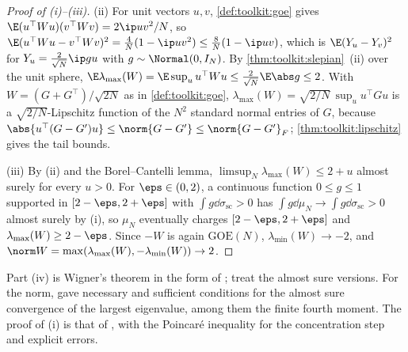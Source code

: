 \begin{refsection}
\begin{proof}[Proof of (i)--(iii)]
(ii) For unit vectors $u,v$, \cref{def:toolkit:goe} gives $\E(u^\top Wu)(v^\top Wv)=2\ip uv^2/N$, so $\E(u^\top Wu-v^\top Wv)^2=\frac4N(1-\ip uv^2)\le\frac8N(1-\ip uv)$, which is $\E(Y_u-Y_v)^2$ for $Y_u=\frac2{\sqrt N}\ip gu$ with $g\sim\Normal(0,I_N)$. By \cref{thm:toolkit:slepian}~(ii) over the unit sphere, $\E\lambda_{\max}(W)=\E\sup_uu^\top Wu\le\frac2{\sqrt N}\E\abs g\le2$. With $W=(G+G^\top)/\sqrt{2N}$ as in \cref{def:toolkit:goe}, $\lambda_{\max}(W)=\sqrt{2/N}\,\sup_uu^\top Gu$ is a $\sqrt{2/N}$-Lipschitz function of the $N^2$ standard normal entries of $G$, because $\abs{u^\top(G-G')u}\le\norm{G-G'}\le\norm{G-G'}_F$; \cref{thm:toolkit:lipschitz} gives the tail bounds.

(iii) By (ii) and the Borel--Cantelli lemma, $\limsup_N\lambda_{\max}(W)\le2+u$ almost surely for every $u>0$. For $\eps\in(0,2)$, a continuous function $0\le g\le1$ supported in $[2-\eps,2+\eps]$ with $\int g\dd\sigma_{\mathrm{sc}}>0$ has $\int g\dd\mu_N\to\int g\dd\sigma_{\mathrm{sc}}>0$ almost surely by (i), so $\mu_N$ eventually charges $[2-\eps,2+\eps]$ and $\lambda_{\max}(W)\ge2-\eps$. Since $-W$ is again $\mathrm{GOE}(N)$, $\lambda_{\min}(W)\to-2$, and $\norm W=\max(\lambda_{\max}(W),-\lambda_{\min}(W))\to2$.
\end{proof}

Part (iv) is Wigner's theorem in the form of \textcite[Theorem~2.1.21]{AndersonGuionnetZeitouni2010}; \textcite[Chapter~2]{BaiSilverstein2010} treat the almost sure versions. For the norm, \textcite{BaiYin1988} gave necessary and sufficient conditions for the almost sure convergence of the largest eigenvalue, among them the finite fourth moment. The proof of (i) is that of \textcite[Section~2.4.1]{AndersonGuionnetZeitouni2010}, with the Poincaré inequality for the concentration step and explicit errors.


\end{refsection}
